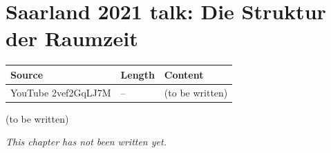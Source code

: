\chapter{Saarland 2021 talk: Die Struktur der Raumzeit}\label{ch:c34}
\begin{paracol}{2}

\begin{sources}
\begin{tabularx}{\linewidth}{@{}l l L@{}}
\toprule
\textbf{Source} & \textbf{Length} & \textbf{Content}\\
\midrule
YouTube 2vef2GqLJ7M & -- & (to be written)\\
\bottomrule
\end{tabularx}

\end{sources}

\begin{reading}
(to be written)
\end{reading}

\emph{This chapter has not been written yet.}

\flushside
\end{paracol}
